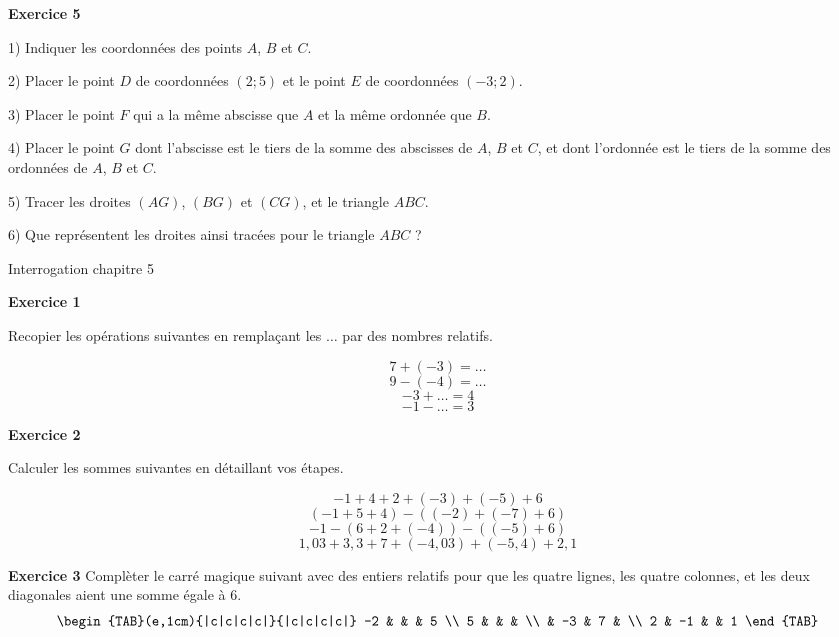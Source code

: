 \documentclass[14pt]{extreport}
\theoremstyle{plain}
\begin{document}
\textbf{Exercice 5} 

\begin{figure}[H]\center
{}
\end{figure}
1) Indiquer les coordonnées des points $A$, $B$ et $C$. 

2) Placer le point $D$ de coordonnées $(2; 5)$ et le point $E$ de coordonnées $(-3; 2)$. 

3) Placer le point $F$ qui a la même abscisse que $A$ et la même 
ordonnée que $B$. 



4) Placer le point $G$ dont l'abscisse est le tiers de la somme des 
abscisses de $A$, $B$ et $C$, et dont l'ordonnée est le tiers de la 
somme des ordonnées de $A$, $B$ et $C$. 

5) Tracer les droites $(AG)$, $(BG)$ et $(CG)$, et le triangle $ABC$. 

6) Que représentent les droites ainsi tracées pour le triangle $ABC$ ?
\newpage 

\begin{center}{\Large Interrogation chapitre 5}\end{center}
\textbf{Exercice 1}  %

Recopier les opérations suivantes en remplaçant les $\ldots$ par des nombres relatifs. 

\[ 7 + (-3) =\ldots \]
\[ 9 - (-4) = \ldots \]
\[ -3 + \ldots = 4 \]
\[ -1 - \ldots = 3\]

\textbf{Exercice 2} %

Calculer les sommes suivantes en détaillant vos étapes. 

\[ -1  + 4 + 2 + (-3) + (-5) + 6 \]
\[ (-1  + 5 + 4) - ((-2) + (-7) + 6 )\]
\[ -1  - ( 6 + 2 + (-4) ) - ((-5) + 6) \]
\[ 1,03  + 3,3 + 7 + (-4,03)   + (-5,4) + 2,1  \]




\textbf{Exercice 3} %
Complèter le carré magique suivant avec des entiers relatifs pour que les quatre lignes, les quatre colonnes, 
et les deux diagonales aient une somme égale à $6$. 
%
\[
\begin{TAB}(e,1cm){|c|c|c|c|}{|c|c|c|c|}
    -2 & & & 5 \\
    5 &  &  &  \\
      & -3 & 7 & \\
     2 & -1 &  & 1
\end{TAB}
\]
\end{document}
